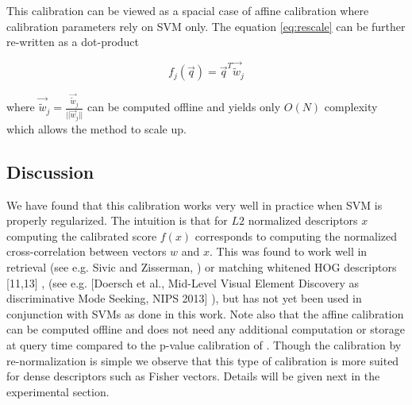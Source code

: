       \noindent
      This calibration can be viewed as a spacial case of affine calibration where calibration parameters rely on SVM only. The equation \eqref{eq:rescale} can be further re-written as a dot-product
      
      \begin{equation}
         f_j(\vec{q}) = \vec{q}^T\vec{\tilde{w}}_j
         \label{eq:rescaled}
      \end{equation}

      \noindent
      where $\vec{\tilde{w}}_j=\frac{\vec{\tilde{w}}_j}{||\vec{w}_j||}$ can be computed offline and yields only $O(N)$ complexity which allows the method to scale up.
   
   \subsection{Discussion}
      We have found that this calibration works very well in practice when SVM is properly regularized.
      The intuition is that for $L2$ normalized descriptors $x$ computing the calibrated score $f(x)$ corresponds to computing the normalized cross-correlation between vectors $w$ and $x$. This was found to work well in retrieval (see e.g. Sivic and Zisserman, \cite{}) or matching whitened HOG descriptors [11,13] \cite{}, \cite{} (see e.g. [Doersch et al., Mid-Level Visual Element Discovery as discriminative Mode Seeking, NIPS 2013] \cite{}), but has not yet been used in conjunction with SVMs as done in this work. Note also that the affine calibration can be computed offline and does not need any additional computation or storage at query time compared to the p-value calibration of \cite{Gronat13}.
      Though the calibration by re-normalization is simple we observe that this type of calibration is more suited for dense descriptors such as Fisher vectors. Details will be given next in the experimental section. 


